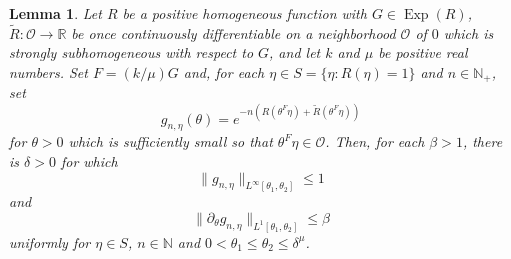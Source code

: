 \documentclass[11pt]{article}
\newtheorem{lemma}[theorem]{Lemma}
\theoremstyle{remark}
\newcommand\Exp{\operatorname{Exp}}
\begin{document}
\begin{lemma}\label{lem:AmplitudeSobolevEstimates}
Let $R$ be a positive homogeneous function with $G\in\Exp(R)$, $\widetilde{R}:\mathcal{O}\to\mathbb{R}$ be once continuously differentiable on a neighborhood $\mathcal{O}$ of $0$ which is strongly subhomogeneous with respect to $G$, and let $k$ and $\mu$ be positive real numbers. Set $F=(k/\mu) G$ and, for each $\eta\in S=\{\eta:R(\eta)=1\}$ and $n\in\mathbb{N}_+$, set
\begin{equation*}
    g_{n,\eta}(\theta)=e^{-n\left(R\left(\theta^F\eta\right)+\widetilde{R}\left(\theta^F\eta\right)\right)}
\end{equation*}
for $\theta>0$ which is sufficiently small so that $\theta^F\eta\in\mathcal{O}$. Then, for each $\beta>1$, there is $\delta>0$ for which 
\begin{equation*}
    \|g_{n,\eta}\|_{L^\infty[\theta_1,\theta_2]}\leq 1
\end{equation*}
and
\begin{equation*}
    \|\partial_\theta g_{n,\eta}\|_{L^1[\theta_1,\theta_2]}\leq \beta
\end{equation*}
uniformly for $\eta\in S$, $n\in\mathbb{N}$ and $0<\theta_1\leq\theta_2\leq \delta^{\mu}$.
\end{lemma}
\end{document}
